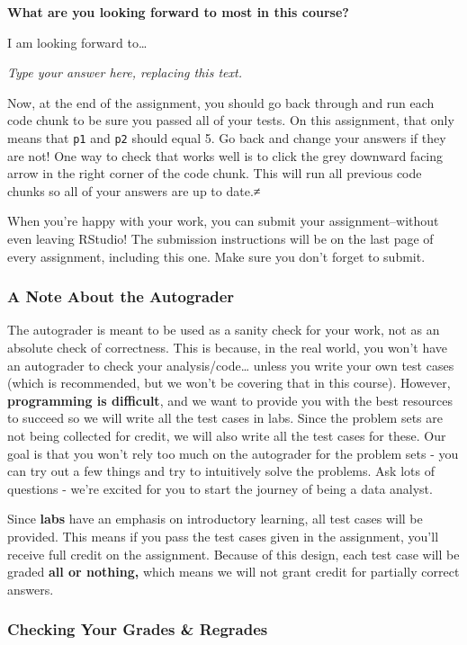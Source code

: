 \documentclass[
]{article}
\begin{document}
\textbf{What are you looking forward to most in this course?}

I am looking forward to\ldots{}

\emph{Type your answer here, replacing this text.}

Now, at the end of the assignment, you should go back through and run
each code chunk to be sure you passed all of your tests. On this
assignment, that only means that \texttt{p1} and \texttt{p2} should
equal 5. Go back and change your answers if they are not! One way to
check that works well is to click the grey downward facing arrow in the
right corner of the code chunk. This will run all previous code chunks
so all of your answers are up to date.≠

When you're happy with your work, you can submit your
assignment--without even leaving RStudio! The submission instructions
will be on the last page of every assignment, including this one. Make
sure you don't forget to submit.

\subsubsection{A Note About the
Autograder}\label{a-note-about-the-autograder}

The autograder is meant to be used as a sanity check for your work, not
as an absolute check of correctness. This is because, in the real world,
you won't have an autograder to check your analysis/code\ldots{} unless
you write your own test cases (which is recommended, but we won't be
covering that in this course). However, \textbf{programming is
difficult}, and we want to provide you with the best resources to
succeed so we will write all the test cases in labs. Since the problem
sets are not being collected for credit, we will also write all the test
cases for these. Our goal is that you won't rely too much on the
autograder for the problem sets - you can try out a few things and try
to intuitively solve the problems. Ask lots of questions - we're excited
for you to start the journey of being a data analyst.

Since \textbf{labs} have an emphasis on introductory learning, all test
cases will be provided. This means if you pass the test cases given in
the assignment, you'll receive full credit on the assignment. Because of
this design, each test case will be graded \textbf{all or nothing,}
which means we will not grant credit for partially correct answers.

\subsubsection{Checking Your Grades \&
Regrades}\label{checking-your-grades-regrades}
\end{document}
